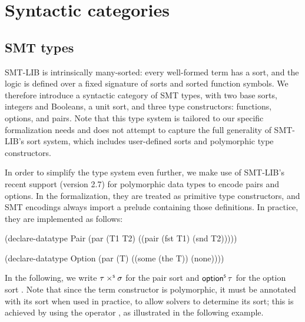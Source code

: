 \section{Syntactic categories}
\label{sec:smt-syntax}

\subsection{SMT types}
\label{subsec:smt-type-system}

SMT-LIB is intrinsically many-sorted: every well-formed term has a sort, and the logic is defined
over a fixed signature of sorts and sorted function symbols.
We therefore introduce a syntactic category of SMT types, with two base sorts,
integers and Booleans, a unit sort, and three type constructors: functions,
options, and pairs.
Note that this type system is tailored to our specific formalization needs and does not
attempt to capture the full generality of SMT-LIB's sort system, which includes user-defined
sorts and polymorphic type constructors.

In order to simplify the type system even further, we make use of SMT-LIB's recent support
(version 2.7) for polymorphic data types to encode pairs and options.
In the formalization, they are treated as primitive type constructors, and SMT encodings always
import a prelude containing those definitions. In practice, they are implemented as follows:

\noindent
\begin{minipage}[t]{0.45\textwidth}
  \begin{smtlisting}
(declare-datatype Pair
  (par (T1 T2)
    ((pair (fst T1) (snd T2)))))
  \end{smtlisting}
\end{minipage}\hfill
\begin{minipage}[t]{0.45\textwidth}
  \begin{smtlisting}
(declare-datatype Option
  (par (T)
    ((some (the T)) (none))))
  \end{smtlisting}
\end{minipage}
\medskip

In the following, we write \(\tau \mathbin{\times^{\scriptscriptstyle{\mathsf{S}}}} \sigma\) for the pair sort  and \(\mathord{\mathsf{option}^{\scriptscriptstyle{\mathsf{S}}}}\,\tau\) for the option sort .
Note that since the term constructor  is polymorphic, it must be annotated with its sort when used in practice, to allow solvers to determine its sort; this is achieved by using the operator , as illustrated in the following example.

